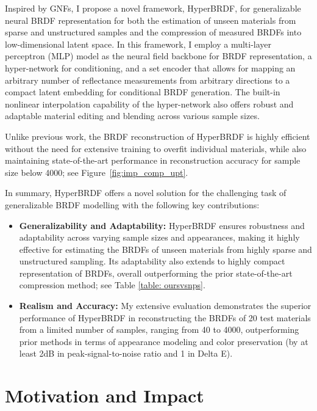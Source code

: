 Inspired by GNFs, I propose a novel framework, HyperBRDF, for generalizable neural BRDF representation for both the estimation of unseen materials from sparse and unstructured samples and the compression of measured BRDFs into low-dimensional latent space. In this framework, I employ a multi-layer perceptron (MLP) model as the neural field backbone for BRDF representation, a hyper-network for conditioning, and a set encoder that allows for mapping an arbitrary number of reflectance measurements from arbitrary directions to a compact latent embedding for conditional BRDF generation. 
The built-in nonlinear interpolation capability of the hyper-network also offers robust and adaptable material editing and blending across various sample sizes.


Unlike previous work, the BRDF reconstruction of HyperBRDF is highly efficient without the need for extensive training to overfit individual materials, while also maintaining state-of-the-art performance in reconstruction accuracy for sample size below 4000; see Figure~\ref{fig:imp_comp_upt}.


In summary, HyperBRDF offers a novel solution for the challenging task of generalizable BRDF modelling with the following key contributions:
\begin{itemize}
    \item{\textbf{Generalizability and Adaptability:} HyperBRDF ensures robustness and adaptability across varying sample sizes and appearances, making it highly effective for estimating the BRDFs of unseen materials from highly sparse and unstructured sampling. Its adaptability also extends to highly compact representation of BRDFs, overall outperforming the prior state-of-the-art compression method; see Table \ref{table: oursvsnps}.}
    

    \item{\textbf{Realism and Accuracy:}
    My extensive evaluation demonstrates the superior performance of HyperBRDF in reconstructing the BRDFs of 20 test materials from a limited number of samples, ranging from 40 to 4000, outperforming prior methods in terms of appearance modeling and color preservation (by at least 2dB in peak-signal-to-noise ratio and 1 in Delta E).
    }
\end{itemize}

\section{Motivation and Impact}
\label{sec:hyperbrdf-mot}

